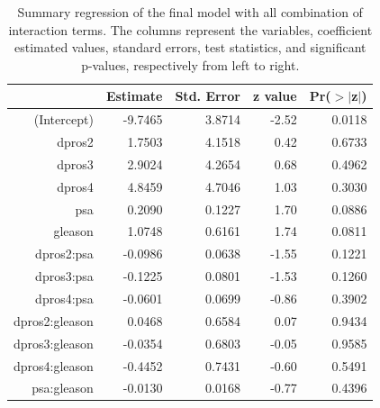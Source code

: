 \documentclass[11pt]{article}\usepackage[]{graphicx}\usepackage[]{color}
\begin{document}
\begin{center}
\begin{table}[ht]
\centering
\begin{tabular}{rrrrr}
  \hline
 & Estimate & Std. Error & z value & Pr($>$$|$z$|$) \\ 
  \hline
(Intercept) & -9.7465 & 3.8714 & -2.52 & 0.0118 \\ 
  dpros2 & 1.7503 & 4.1518 & 0.42 & 0.6733 \\ 
  dpros3 & 2.9024 & 4.2654 & 0.68 & 0.4962 \\ 
  dpros4 & 4.8459 & 4.7046 & 1.03 & 0.3030 \\ 
  psa & 0.2090 & 0.1227 & 1.70 & 0.0886 \\ 
  gleason & 1.0748 & 0.6161 & 1.74 & 0.0811 \\ 
  dpros2:psa & -0.0986 & 0.0638 & -1.55 & 0.1221 \\ 
  dpros3:psa & -0.1225 & 0.0801 & -1.53 & 0.1260 \\ 
  dpros4:psa & -0.0601 & 0.0699 & -0.86 & 0.3902 \\ 
  dpros2:gleason & 0.0468 & 0.6584 & 0.07 & 0.9434 \\ 
  dpros3:gleason & -0.0354 & 0.6803 & -0.05 & 0.9585 \\ 
  dpros4:gleason & -0.4452 & 0.7431 & -0.60 & 0.5491 \\ 
  psa:gleason & -0.0130 & 0.0168 & -0.77 & 0.4396 \\ 
   \hline
\end{tabular}
\caption{Summary regression of the final model with all combination of interaction terms. The columns represent the variables, coefficient estimated values, standard errors, test statistics, and significant p-values, respectively from left to right.} 
\label{reg_summary_int}
\end{table}

\end{center}
\end{document}
